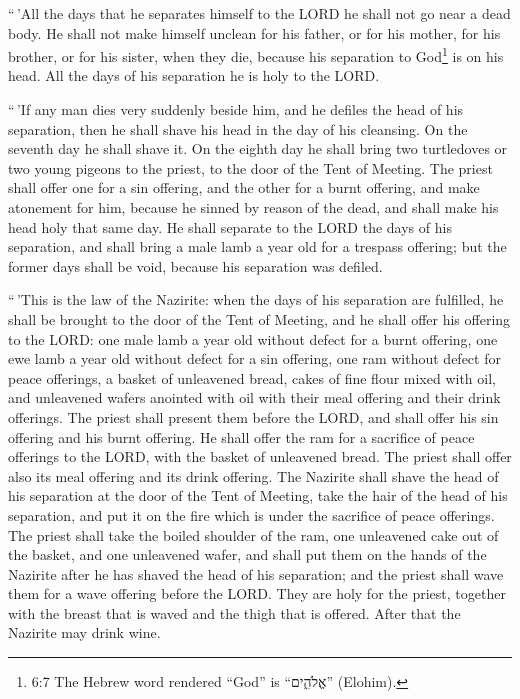  ``\,'All the days that he separates himself to the LORD he
shall not go near a dead body.  He shall not make himself
unclean for his father, or for his mother, for his brother, or for his
sister, when they die, because his separation to God\footnote{6:7 The
  Hebrew word rendered ``God'' is ``אֱלֹהִ֑ים'' (Elohim).} is on his
head.  All the days of his separation he is holy to the
LORD.

 ``\,'If any man dies very suddenly beside him, and he
defiles the head of his separation, then he shall shave his head in the
day of his cleansing. On the seventh day he shall shave it.
 On the eighth day he shall bring two turtledoves or two
young pigeons to the priest, to the door of the Tent of Meeting.
 The priest shall offer one for a sin offering, and the
other for a burnt offering, and make atonement for him, because he
sinned by reason of the dead, and shall make his head holy that same
day.  He shall separate to the LORD the days of his
separation, and shall bring a male lamb a year old for a trespass
offering; but the former days shall be void, because his separation was
defiled.

 ``\,'This is the law of the Nazirite: when the days of his
separation are fulfilled, he shall be brought to the door of the Tent of
Meeting,  and he shall offer his offering to the LORD: one
male lamb a year old without defect for a burnt offering, one ewe lamb a
year old without defect for a sin offering, one ram without defect for
peace offerings,  a basket of unleavened bread, cakes of
fine flour mixed with oil, and unleavened wafers anointed with oil with
their meal offering and their drink offerings.  The priest
shall present them before the LORD, and shall offer his sin offering and
his burnt offering.  He shall offer the ram for a sacrifice
of peace offerings to the LORD, with the basket of unleavened bread. The
priest shall offer also its meal offering and its drink offering.
 The Nazirite shall shave the head of his separation at the
door of the Tent of Meeting, take the hair of the head of his
separation, and put it on the fire which is under the sacrifice of peace
offerings.  The priest shall take the boiled shoulder of
the ram, one unleavened cake out of the basket, and one unleavened
wafer, and shall put them on the hands of the Nazirite after he has
shaved the head of his separation;  and the priest shall
wave them for a wave offering before the LORD. They are holy for the
priest, together with the breast that is waved and the thigh that is
offered. After that the Nazirite may drink wine.

